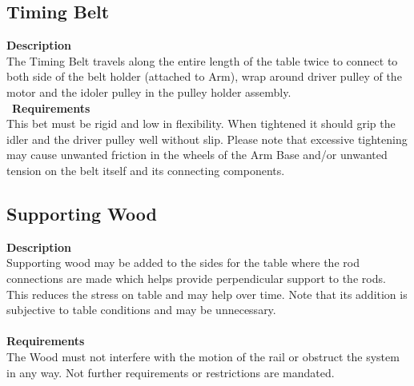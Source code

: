 \documentclass[titlepage]{article}
\begin{document}
\subsection{Timing Belt}
\textbf{Description}\\
The Timing Belt travels along the entire length of the table twice to connect to both side of the belt holder (attached to Arm), wrap around driver pulley of the motor and the idoler pulley in the pulley holder assembly.\\\
\textbf{Requirements}\\
This bet must be rigid and low in flexibility. When tightened it should grip the idler and the driver pulley well without slip. Please note that excessive tightening may cause unwanted friction in the wheels of the Arm Base and/or unwanted tension on the belt itself and its connecting components.

\subsection{Supporting Wood}
\textbf{Description}\\
Supporting wood may be added to the sides for the table where the rod connections are made which helps provide perpendicular support to the rods. This reduces the stress on table and may help over time. Note that its addition is subjective to table conditions and may be unnecessary.
\\~\\
\textbf{Requirements}\\
The Wood must not interfere with the motion of the rail or obstruct the system in any way. Not further requirements or restrictions are mandated.

\newpage
\end{document}

